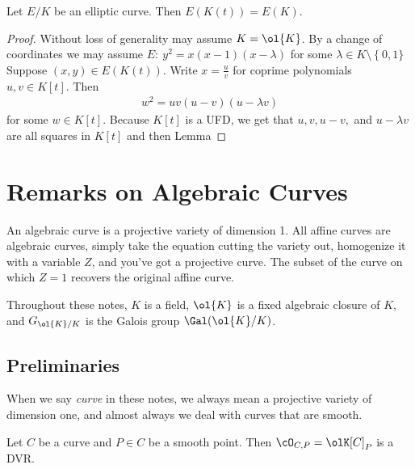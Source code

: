 \bigskip

\begin{cor}[1.6 in Lecture]\label{cor:points-on-E-same-for-K-and-functions-on-K}
	Let $E/K$ be an elliptic curve. Then $E(K(t)) = E(K)$.
\end{cor}
\begin{proof}
	Without loss of generality may assume $K = \ol{K}$. By a change of coordinates we may assume $E: ~ y^{2}=x(x-1)(x-\lambda)$ for some $\lambda \in K\setminus \left\{0,1\}\right.$ Suppose $(x,y) \in E(K(t))$. Write $x = \frac{u}{v}$ for coprime polynomials $u,v \in K[t]$. Then
	 \begin{align*}
		w^{2} = uv(u - v)(u - \lambda v)
	\end{align*}
	for some $w \in K[t]$. Because $K[t]$ is a UFD, we get that $u,v,u-v,$ and $u - \lambda v$ are all squares in $K[t]$ and then Lemma
\end{proof}

\bigskip

\section{Remarks on Algebraic Curves}
An algebraic curve is a projective variety of dimension 1. All affine curves are algebraic curves, simply take the equation cutting the variety out, homogenize it with a variable $Z$, and you've got a projective curve. The subset of the curve on which $Z = 1$ recovers the original affine curve.

Throughout these notes, $K$ is a field, $\ol{K}$ is a fixed algebraic closure of $K$, and $G_{\ol{K}/K}$ is the Galois group $\Gal(\ol{K}/K)$.

\subsection{Preliminaries}
When we say \emph{curve} in these notes, we always mean a projective variety of dimension one, and almost always we deal with curves that are smooth.

\begin{prop}\label{prop:local-ring-of-curve-is-dvr}
	Let $C$ be a curve and $P \in C$ be a smooth point. Then $\cO_{C,P} = \olK[C]_P$ is a DVR.
\end{prop}

